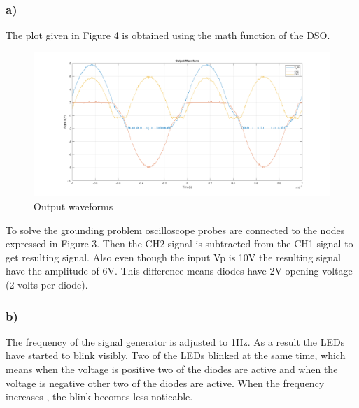 \documentclass[letterpaper,12pt]{article}
\begin{document}
\subsubsection{a)}
The plot given in Figure 4 is obtained using the math function of the DSO. 
\begin{figure}[H]
	\centering
   \includegraphics[width=1\textwidth]{2a_plot.png}
   \caption{Output waveforms}
\end{figure}
To solve the grounding problem oscilloscope probes are connected to the nodes expressed in Figure 3. Then the CH2 signal is subtracted from the CH1 signal to get resulting signal. Also even though the input Vp is 10V the resulting signal have the amplitude of 6V. This difference means diodes have 2V opening voltage (2 volts per diode). 

\subsubsection{b)}
The frequency of the signal generator is adjusted to 1Hz. As a result the LEDs have started to blink visibly. Two of the LEDs blinked at the same time, which means when the voltage is positive two of the diodes are active and when the voltage is negative other two of the diodes are active. When the frequency increases , the blink becomes less noticable.
\end{document}
